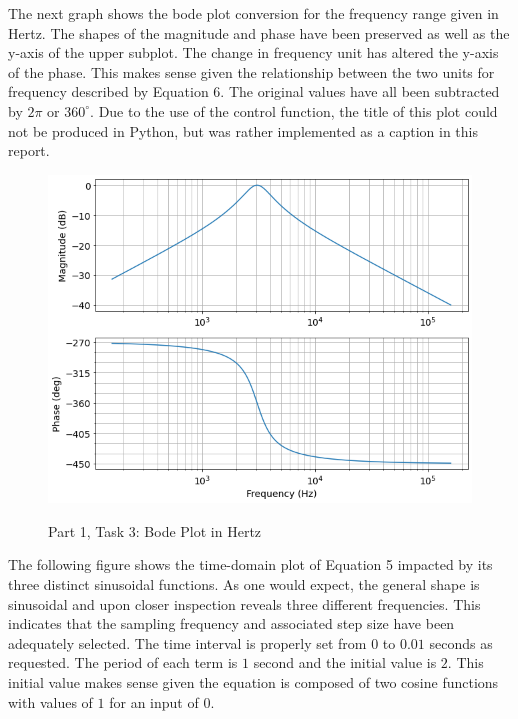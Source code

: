 \documentclass[12pt]{report}
\newcommand{\adjust}{\hspace{2em}}
\begin{document}
The next graph shows the bode plot conversion for the frequency range given in Hertz. The shapes of the magnitude and phase have been preserved as well as the y-axis of the upper subplot. The change in frequency unit has altered the y-axis of the phase. This makes sense given the relationship between the two units for frequency described by Equation 6. The original values have all been subtracted by $ 2\pi $ or $ 360^\circ $. Due to the use of the control function, the title of this plot could not be produced in Python, but was rather implemented as a caption in this report. \\

\begin{figure}[h]
	\begin{center}
		\caption*{\scriptsize \adjust Part 1, Task 3: Bode Plot in Hertz}
		\vspace*{-0.43 cm}
		\includegraphics[scale = 0.5]{Lab 10 - Plots/Part1-Task3.png}\\[0.3 cm]
	\end{center}
\end{figure}

The following figure shows the time-domain plot of Equation 5 impacted by its three distinct sinusoidal functions. As one would expect, the general shape is sinusoidal and upon closer inspection reveals three different frequencies. This indicates that the sampling frequency and associated step size have been adequately selected. The time interval is properly set from $ 0 $ to $ 0.01 $ seconds as requested. The period of each term is $ 1 $ second and the initial value is $ 2 $. This initial value makes sense given the equation is composed of two cosine functions with values of $ 1 $ for an input of $ 0 $. \\
\end{document}

